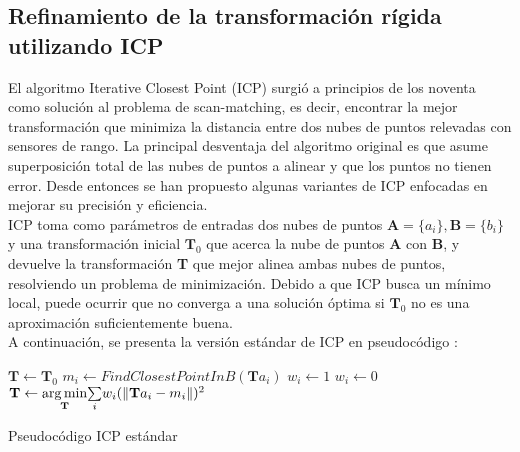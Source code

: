 \subsection{Refinamiento de la transformación rígida utilizando ICP}

El algoritmo Iterative Closest Point (ICP) \cite{Besl92} surgió a principios de los noventa como solución al problema de scan-matching, es decir, encontrar la mejor transformación que minimiza la distancia entre dos nubes de puntos relevadas con sensores de rango. La principal desventaja del algoritmo original es que asume superposición total de las nubes de puntos a alinear y que los puntos no tienen error. Desde entonces se han propuesto algunas variantes de ICP enfocadas en mejorar su precisión y eficiencia.\\
ICP toma como parámetros de entradas dos nubes de puntos $\textbf{A} = \{a_{i}\}, \textbf{B} = \{b_{i}\}$ y una transformación inicial $\textbf{T}_{0}$ que acerca la nube de puntos \textbf{A} con \textbf{B}, y devuelve la transformación \textbf{T} que mejor alinea ambas nubes de puntos, resolviendo un problema de minimización. Debido a que ICP busca un mínimo local, puede ocurrir que no converga a una solución óptima si $\textbf{T}_{0}$ no es una aproximación suficientemente buena. \\

A continuación, se presenta la versión estándar de ICP en pseudocódigo :
\begin{algorithm}
\begin{algorithmic}

\STATE $\textbf{T} \leftarrow \textbf{T}_{0}$
\STATE $m_{i} \leftarrow FindClosestPointInB(\textbf{T} a_{i})$
\STATE $w_{i} \leftarrow 1$
\ELSE
\STATE $w_{i} \leftarrow 0$
\ENDIF
\ENDFOR
\STATE $ \textbf{T} \leftarrow \underset{\textbf{T}}{\arg\min}  \underset{i}{\sum} w_{i} (\lVert \textbf{T}a_{i} - m_{i} \rVert)^{2} $
\ENDWHILE

\end{algorithmic}
\caption{Pseudocódigo ICP estándar}
\label{icp-pseudocodigo}
\end{algorithm}

